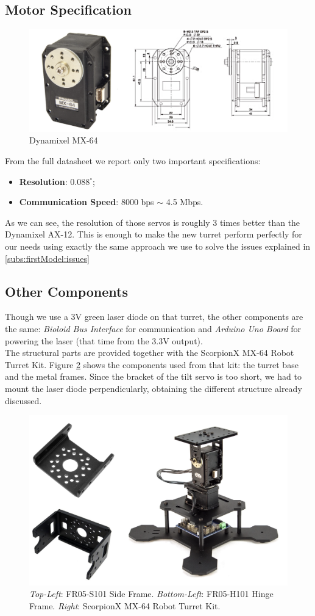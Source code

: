 \subsection{Motor Specification}
\begin{figure}
	\centering
	\includegraphics[width=\textwidth]{img/mx64.png}%
	\caption{Dynamixel MX-64}
	\label{fig:mx64}
\end{figure}
From the full datasheet \cite{datasheet-MX64} we report only two important specifications:
\begin{itemize}
    \item \textbf{Resolution}: $0.088^{\circ}$;
    \item \textbf{Communication Speed}: 8000 bps $\sim$ 4.5 Mbps.
\end{itemize}
As we can see, the resolution of those servos is roughly 3 times better than the Dynamixel AX-12. This is enough to make the new turret perform perfectly for our needs using exactly the same approach we use to solve the issues explained in \ref{subs:firstModel:issues}
\subsection{Other Components}
Though we use a 3V green laser diode on that turret, the other components are the same: \emph{Bioloid Bus Interface} for communication and \emph{Arduino Uno Board} for powering the laser (that time from the 3.3V output).\\
The structural parts are provided together with the ScorpionX MX-64 Robot Turret Kit. Figure \ref{fig:mx64Pieces} shows the components used from that kit: the turret base and the metal frames. Since the bracket of the tilt servo is too short, we had to mount the laser diode perpendicularly, obtaining the different structure already discussed.
\begin{figure}
	\centering
	\includegraphics[width=.7\textwidth]{img/mx64Pieces.png}%
	\caption{\emph{Top-Left}: FR05-S101 Side Frame. \emph{Bottom-Left}: FR05-H101 Hinge Frame. \emph{Right}: ScorpionX MX-64 Robot Turret Kit.}
	\label{fig:mx64Pieces}
\end{figure}
